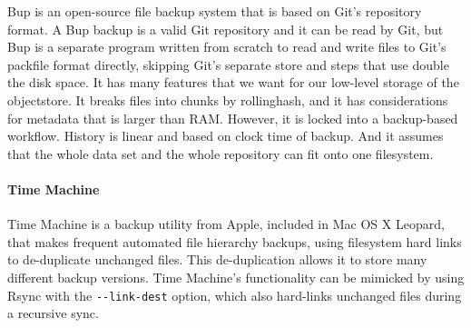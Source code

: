 Bup \cite{bup_homepage} is an open-source file backup system that is based on
Git's \gls{repository} format. A Bup backup is a valid Git \gls{repository} and
it can be read by Git, but Bup is a separate program written from scratch to
read and write files to Git's \gls{packfile} format directly, skipping Git's
separate store and  steps that use double the disk
space. It has many features that we want for our low-level storage of the
\gls{objectstore}. It breaks files into chunks by \gls{rollinghash}, and it has
considerations for metadata that is larger than RAM. However, it is locked into
a backup-based workflow. History is linear and based on clock time of backup.
And it assumes that the whole data set and the whole \gls{repository} can fit
onto one filesystem.


\paragraph{Time Machine}

Time Machine\cite{timemachine_patent} is a backup utility from Apple, included
in Mac OS X Leopard, that makes frequent automated file hierarchy backups, using
filesystem hard links to de-duplicate unchanged files\cite{timemachine_magic}.
This de-duplication allows it to store many different backup versions. Time
Machine's functionality can be mimicked by using Rsync with the
\lstinline{--link-dest} option, which also hard-links unchanged files during a
recursive sync\cite{timemachine_foreveryunix}.
